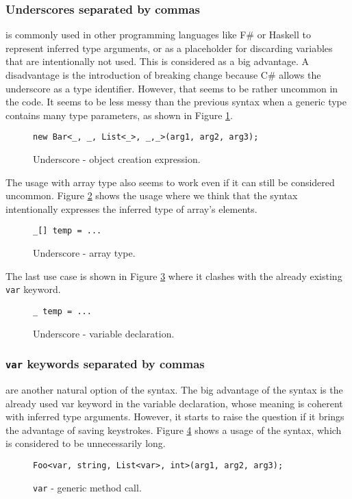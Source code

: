 \subsubsection{Underscores separated by commas} 
is commonly used in other programming languages like F\# or Haskell to represent inferred type arguments, or as a placeholder for discarding variables that are intentionally not used. 
This is considered as a big advantage. 
A disadvantage is the introduction of breaking change because C\# allows the underscore as a type identifier. 
However, that seems to be rather uncommon in the code. 
It seems to be less messy than the previous syntax when a generic type contains many type parameters, as shown in Figure \ref{img50:opU1}.
\begin{figure}[h!]
\begin{lstlisting}[style=csharp]
new Bar<_, _, List<_>, _,_>(arg1, arg2, arg3);
\end{lstlisting}
\caption{Underscore - object creation expression.}
\label{img50:opU1}
\end{figure}
\par
The usage with array type also seems to work even if it can still be considered uncommon. 
Figure \ref{img51:opU4} shows the usage where we think that the syntax intentionally expresses the inferred type of array’s elements.
\begin{figure}[h!]
\begin{lstlisting}[style=csharp]
_[] temp = ...
\end{lstlisting}
\caption{Underscore - array type.}
\label{img51:opU4}
\end{figure}
\par
The last use case is shown in Figure \ref{img52:opU5} where it clashes with the already existing \texttt{var} keyword.
\begin{figure}[h!]
\begin{lstlisting}[style=csharp]
_ temp = ...
\end{lstlisting}
\caption{Underscore - variable declaration.}
\label{img52:opU5}
\end{figure}


\subsubsection{\texttt{var} keywords separated by commas} 
are another natural option of the syntax. 
The big advantage of the syntax is the already used var keyword in the variable declaration, whose meaning is coherent with inferred type arguments. 
However, it starts to raise the question if it brings the advantage of saving keystrokes. 
Figure \ref{img52:opV1} shows a usage of the syntax, which is considered to be unnecessarily long.
\begin{figure}[h!]
\begin{lstlisting}[style=csharp]
Foo<var, string, List<var>, int>(arg1, arg2, arg3);
\end{lstlisting}
\caption{\texttt{var} - generic method call.}
\label{img52:opV1}
\end{figure}

